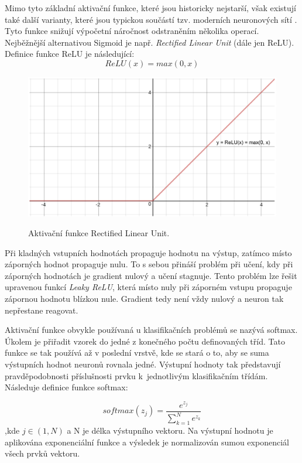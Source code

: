 Mimo tyto základní aktivační funkce, které jsou historicky nejstarší, 
však existují také další varianty,
které jsou typickou součástí tzv. moderních neuronových sítí \cite{agarap_relu}. 
Tyto funkce snižují výpočetní náročnost odstraněním několika operací.
Nejběžnější alternativou Sigmoid je např. \emph{Rectified Linear Unit} (dále jen ReLU).
Definice funkce ReLU je následující:
\begin{equation}
    ReLU(x) = max(0, x)
\end{equation}

\begin{figure}[h]\centering
    \centering
    \includegraphics[width=0.8\linewidth]{obrazky/ReLUGraf.png}\\[1pt]  
    \caption{Aktivační funkce Rectified Linear Unit.}    
    \label{obrazekAktivačníFunkceReLU}
\end{figure}


Při kladných vstupních hodnotách propaguje hodnotu na výstup,
zatímco místo záporných hodnot propaguje nulu.
To s sebou přináší problém při učení,
kdy při záporných hodnotách je gradient nulový a učení stagnuje.
Tento problém lze řešit upravenou funkcí \emph{Leaky ReLU},
která místo nuly při záporném vstupu propaguje zápornou hodnotu blízkou nule.
Gradient tedy není vždy nulový a neuron tak nepřestane reagovat.
\par

Aktivační funkce obvykle používaná u klasifikačních problémů se nazývá softmax.
Úkolem je přiřadit vzorek do jedné z konečného počtu definovaných tříd.
Tato funkce se tak používá až v poslední vrstvě,
kde se stará o to, aby se suma výstupních hodnot neuronů rovnala jedné.
Výstupní hodnoty tak představují pravděpodobnosti příslušnosti prvku
k~jednotlivým klasifikačním třídám.
Následuje definice funkce softmax:

\begin{equation}
    softmax(z_j) = \frac{e^{z_j}}{\sum^{N}_{k=1}e^{z_k}}
\end{equation}
,kde $j \in (1,N)$ a N je délka výstupního vektoru.
Na výstupní hodnotu je aplikována exponenciální funkce
a výsledek je normalizován sumou exponenciál všech prvků vektoru.

